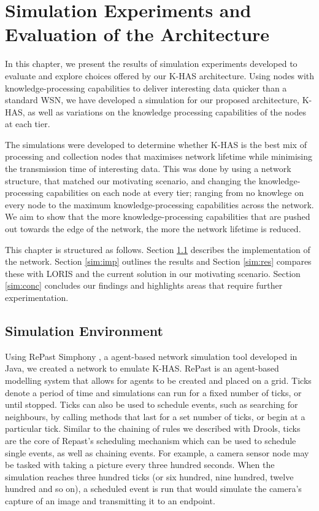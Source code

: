 \chapter{Simulation Experiments and Evaluation of the Architecture}
In this chapter, we present the results of simulation experiments developed to evaluate and explore choices offered by our K-HAS architecture. Using nodes with knowledge-processing capabilities to deliver interesting data quicker than a standard WSN, we have developed a simulation for our proposed architecture, K-HAS, as well as variations on the knowledge processing capabilities of the nodes at each tier.

The simulations were developed to determine whether K-HAS is the best mix of processing and collection nodes that maximises network lifetime while minimising the transmission time of interesting data. This was done by using a network structure, that matched our motivating scenario, and changing the knowledge-processing capabilities on each node at every tier; ranging from no knowlege on every node to the maximum knowledge-processing capabilities across the network. We aim to show that the more knowledge-processing capabilities that are pushed out towards the edge of the network, the more the network lifetime is reduced.

This chapter is structured as follows. Section \ref{sim:sim} describes the implementation of the network. Section \ref{sim:imp} outlines the results and Section \ref{sim:res} compares these with LORIS and the current solution in our motivating scenario. Section \ref{sim:conc} concludes our findings and highlights areas that require further experimentation.

\section{Simulation Environment}\label{sim:sim}

Using RePast Simphony \cite{Collier2003}, a agent-based network simulation tool developed in Java, we created a network to emulate K-HAS. RePast is an agent-based modelling system that allows for agents to be created and placed on a grid. Ticks denote a period of time and simulations can run for a fixed number of ticks, or until stopped. Ticks can also be used to schedule events, such as searching for neighbours, by calling methods that last for a set number of ticks, or begin at a particular tick. Similar to the chaining of rules we described with Drools, ticks are the core of Repast's scheduling mechanism which can be used to schedule single events, as well as chaining events. For example, a camera sensor node may be tasked with taking a picture every three hundred seconds. When the simulation reaches three hundred ticks (or six hundred, nine hundred, twelve hundred and so on), a scheduled event is run that would simulate the camera's capture of an image and transmitting it to an endpoint.

